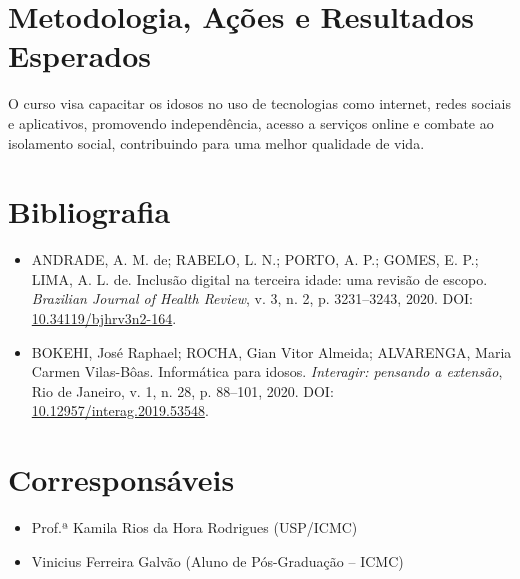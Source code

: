 \documentclass[a4paper,12pt]{article}
\begin{document}
\section*{Metodologia, Ações e Resultados Esperados}
O curso visa capacitar os idosos no uso de tecnologias como internet, redes sociais e aplicativos, promovendo independência, acesso a serviços online e combate ao isolamento social, contribuindo para uma melhor qualidade de vida.

\section*{Bibliografia}
\begin{itemize}
    \item ANDRADE, A. M. de; RABELO, L. N.; PORTO, A. P.; GOMES, E. P.; LIMA, A. L. de. Inclusão digital na terceira idade: uma revisão de escopo. \textit{Brazilian Journal of Health Review}, v. 3, n. 2, p. 3231–3243, 2020. DOI: \url{10.34119/bjhrv3n2-164}.
    \item BOKEHI, José Raphael; ROCHA, Gian Vitor Almeida; ALVARENGA, Maria Carmen Vilas-Bôas. Informática para idosos. \textit{Interagir: pensando a extensão}, Rio de Janeiro, v. 1, n. 28, p. 88–101, 2020. DOI: \url{10.12957/interag.2019.53548}.
\end{itemize}

\section*{Corresponsáveis}
\begin{itemize}
    \item Prof.ª Kamila Rios da Hora Rodrigues (USP/ICMC)
    \item Vinicius Ferreira Galvão (Aluno de Pós-Graduação – ICMC)
\end{itemize}
\end{document}

